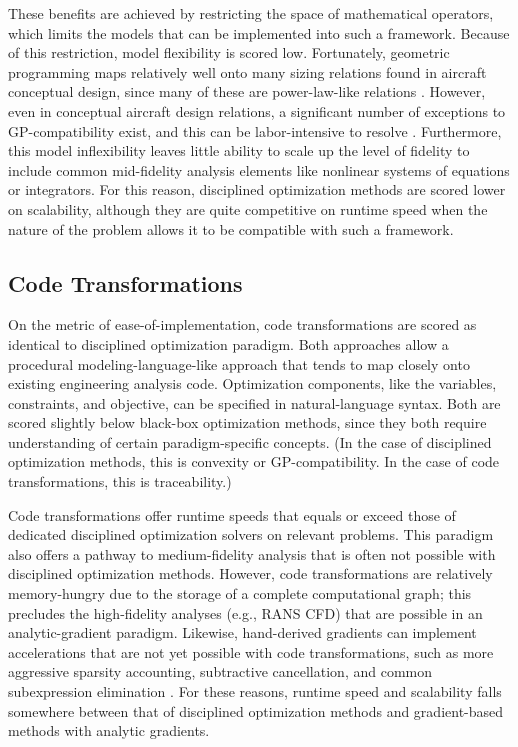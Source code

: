 These benefits are achieved by restricting the space of mathematical operators, which limits the models that can be implemented into such a framework. Because of this restriction, model flexibility is scored low. Fortunately, geometric programming maps relatively well onto many sizing relations found in aircraft conceptual design, since many of these are power-law-like relations \cite{hoburg_geometric_2014}. However, even in conceptual aircraft design relations, a significant number of exceptions to GP-compatibility exist, and this can be labor-intensive to resolve \cite{tao_phd_thesis}. Furthermore, this model inflexibility leaves little ability to scale up the level of fidelity to include common mid-fidelity analysis elements like nonlinear systems of equations or integrators. For this reason, disciplined optimization methods are scored lower on scalability, although they are quite competitive on runtime speed when the nature of the problem allows it to be compatible with such a framework.

\subsection*{Code Transformations}

On the metric of ease-of-implementation, code transformations are scored as identical to disciplined optimization paradigm. Both approaches allow a procedural modeling-language-like approach that tends to map closely onto existing engineering analysis code. Optimization components, like the variables, constraints, and objective, can be specified in natural-language syntax. Both are scored slightly below black-box optimization methods, since they both require understanding of certain paradigm-specific concepts. (In the case of disciplined optimization methods, this is convexity or GP-compatibility. In the case of code transformations, this is traceability.)

Code transformations offer runtime speeds that equals or exceed those of dedicated disciplined optimization solvers on relevant problems. This paradigm also offers a pathway to medium-fidelity analysis that is often not possible with disciplined optimization methods. However, code transformations are relatively memory-hungry due to the storage of a complete computational graph; this precludes the high-fidelity analyses (e.g., RANS CFD) that are possible in an analytic-gradient paradigm. Likewise, hand-derived gradients can implement accelerations that are not yet possible with code transformations, such as more aggressive sparsity accounting, subtractive cancellation, and common subexpression elimination \cite{casadi, martins_complexstep_2003, martins_engineering_2021}. For these reasons, runtime speed and scalability falls somewhere between that of disciplined optimization methods and gradient-based methods with analytic gradients.

